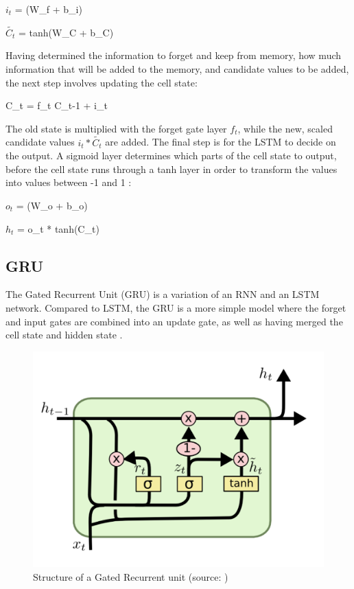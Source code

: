 \indent\newline 
$i_{t}$ = \sigma(W_{f} \cdot[h_{t-1},x_{t}] + b_{i})

\indent\newline 
$\tilde{C_{t}}$ = tanh(W_{C} \cdot[h_{t-1},x_{t}] + b_{C})

\indent\newline 
Having determined the information to forget and keep from memory, how much information that will be added to the memory, and candidate values to be added, the next step involves updating the cell state:

\indent\newline 
C_{t} = f_{t} \ast C_{t-1} + i_{t} \ast {}

\indent\newline 
The old state is multiplied with the forget gate layer $f_{t}$, while the new, scaled candidate values $i_{t}*\tilde{C_{t}}$ are added. The final step is for the LSTM to decide on the output. A sigmoid layer determines which parts of the cell state to output, before the cell state runs through a tanh layer in order to transform the values into values between -1 and 1 \cite{olah}: 

\indent\newline 
$o_{t}$ = \sigma(W_{o} \cdot[h_{t-1},x_{t}] + b_{o})

\indent\newline 
$h_{t}$ = o_{t} * tanh(C_{t})

\subsection{GRU}
The Gated Recurrent Unit (GRU) is a variation of an RNN and an LSTM network. Compared to LSTM, the GRU is a more simple model where the forget and input gates are combined into an update gate, as well as having merged the cell state and hidden state \cite{olah}. 

\indent\newline 
\begin{figure}[H]
\centering
\includegraphics [scale=0.40,angle=360]{figures/gru.png}
\caption{Structure of a Gated Recurrent unit (source: \cite{olah})}
\label{fig:gru}
\end{figure}

